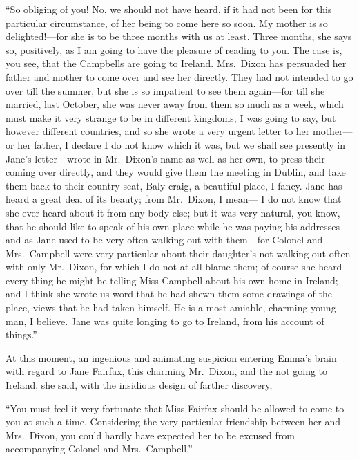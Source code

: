 ``So obliging of you!  No, we should not have heard, if it had not
been for this particular circumstance, of her being to come here
so soon.  My mother is so delighted!---for she is to be three months
with us at least.  Three months, she says so, positively, as I
am going to have the pleasure of reading to you.  The case is,
you see, that the Campbells are going to Ireland.  Mrs.\ Dixon has
persuaded her father and mother to come over and see her directly.
They had not intended to go over till the summer, but she is so
impatient to see them again---for till she married, last October,
she was never away from them so much as a week, which must make
it very strange to be in different kingdoms, I was going to say,
but however different countries, and so she wrote a very urgent letter
to her mother---or her father, I declare I do not know which it was,
but we shall see presently in Jane's letter---wrote in Mr.\ Dixon's
name as well as her own, to press their coming over directly,
and they would give them the meeting in Dublin, and take them back
to their country seat, Baly-craig, a beautiful place, I fancy.
Jane has heard a great deal of its beauty; from Mr.\ Dixon, I mean---%
I do not know that she ever heard about it from any body else;
but it was very natural, you know, that he should like to speak
of his own place while he was paying his addresses---and as Jane used
to be very often walking out with them---for Colonel and Mrs.\ Campbell
were very particular about their daughter's not walking out
often with only Mr.\ Dixon, for which I do not at all blame them;
of course she heard every thing he might be telling Miss Campbell
about his own home in Ireland; and I think she wrote us word
that he had shewn them some drawings of the place, views that he
had taken himself.  He is a most amiable, charming young man,
I believe.  Jane was quite longing to go to Ireland, from his account
of things.''

At this moment, an ingenious and animating suspicion entering
Emma's brain with regard to Jane Fairfax, this charming Mr.\ Dixon,
and the not going to Ireland, she said, with the insidious design
of farther discovery,

``You must feel it very fortunate that Miss Fairfax should be allowed
to come to you at such a time.  Considering the very particular
friendship between her and Mrs.\ Dixon, you could hardly have expected
her to be excused from accompanying Colonel and Mrs.\ Campbell.''

